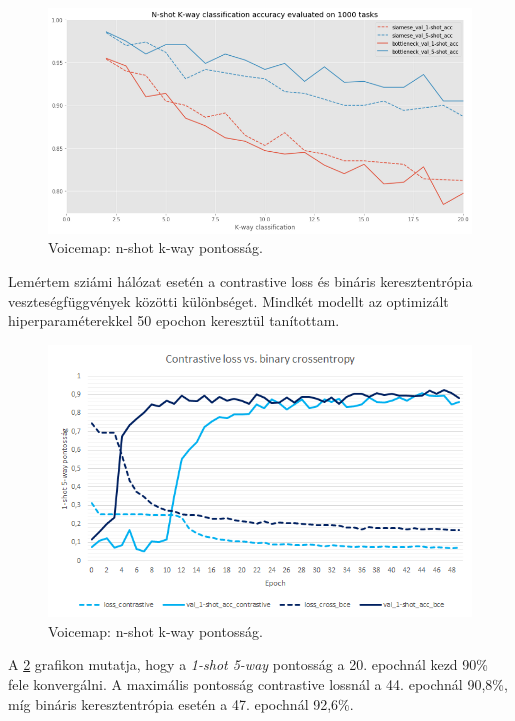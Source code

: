 \begin{figure}[!ht]
	\centering
	\includegraphics[width=150mm, keepaspectratio]{figures/voicemap-n-shot-k-way.png}
	\caption{Voicemap: n-shot k-way pontosság.}
	\label{fig:voicemap-n-shot-k-way}
\end{figure}

\newpage

Lemértem sziámi hálózat esetén a contrastive loss és bináris keresztentrópia veszteségfüggvények közötti különbséget. Mindkét modellt az optimizált hiperparaméterekkel 50 epochon keresztül tanítottam.

\begin{figure}[!ht]
	\centering
	\includegraphics[width=150mm, keepaspectratio]{figures/contrastive_vs_bce.png}
	\caption{Voicemap: n-shot k-way pontosság.}
	\label{fig:contrastive_vs_bce}
\end{figure}

A \ref{fig:contrastive_vs_bce} grafikon mutatja, hogy a \emph{1-shot 5-way} pontosság a 20. epochnál kezd 90\% fele konvergálni. A maximális pontosság contrastive lossnál a 44. epochnál 90,8\%, míg bináris keresztentrópia esetén a 47. epochnál 92,6\%.

